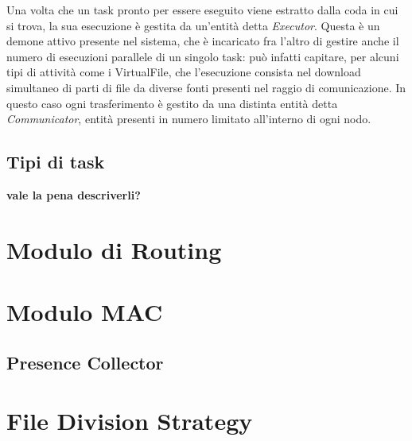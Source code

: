 Una volta che un task pronto per essere eseguito viene estratto dalla coda in cui si trova, la sua esecuzione è gestita da un'entità detta \textit{Executor}. Questa è un demone attivo presente nel sistema, che è incaricato fra l'altro di gestire anche il numero di esecuzioni parallele di un singolo task: può infatti capitare, per alcuni tipi di attività come i VirtualFile, che l'esecuzione consista nel download simultaneo di parti di file da diverse fonti presenti nel raggio di comunicazione. In questo caso ogni trasferimento è gestito da una distinta entità detta \textit{Communicator}, entità presenti in numero limitato all'interno di ogni nodo.

\subsection{Tipi di task}
\textbf{vale la pena descriverli?}

\section{Modulo di Routing}
\section{Modulo MAC}

\subsection{Presence Collector} 
\label{descrPresenceCollector}

\section{File Division Strategy}
\label{descrFileDivisionStrategy}
 

